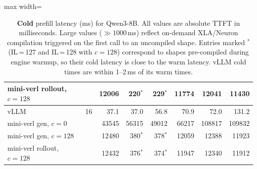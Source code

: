 \begin{table}[htbp]
\begin{adjustbox}{max width=\textwidth}
\begin{tabular}{lcrrrrrr}
        mini-verl rollout, $c{=}128$ &   & 12006 & 220$^*$ & 229$^*$ & 11774 & 12041 & 11430 \\
        \midrule
        vLLM                         & 16 & 37.1 & 37.0 & 56.8 & 70.9 & 72.0 & 131.2 \\
        mini-verl gen, $c{=}0$       &    & 43545 & 56315 & 49012 & 66217 & 108817 & 109832 \\
        mini-verl gen, $c{=}128$     &    & 12480 & 380$^*$ & 378$^*$ & 12059 & 12388 & 11923 \\
        mini-verl rollout, $c{=}128$ &    & 12432 & 376$^*$ & 374$^*$ & 11947 & 12340 & 11912 \\
        \bottomrule
    \end{tabular}
    \end{adjustbox}
    \caption{%
        \textbf{Cold} prefill latency (ms) for Qwen3-8B.
        All values are absolute TTFT in milliseconds.
        Large values (${\gg}1000$\,ms) reflect on-demand XLA/Neuron
        compilation triggered on the first call to an uncompiled shape.
        Entries marked ${}^*$ (IL\,=\,127 and IL\,=\,128 with $c{=}128$)
        correspond to shapes pre-compiled during engine warmup, so their
        cold latency is close to the warm latency.
        vLLM cold times are within 1--2\,ms of its warm times.
    }
    \label{tab:qwen3-prefill-cold}
\end{table}
